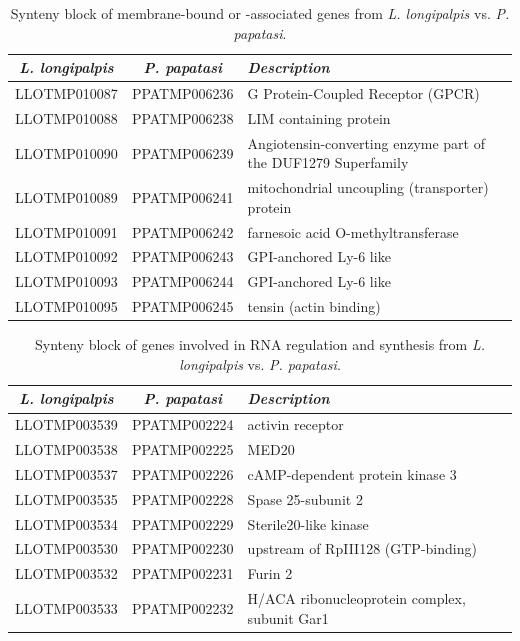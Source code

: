 \begin{table}[H]
  \centering
  \begin{tabular}{c c l} \hline
    \emph{L. longipalpis} & \emph{P. papatasi} & \emph{Description} \\ \hline
    LLOTMP010087 & PPATMP006236 & G Protein-Coupled Receptor (GPCR) \\
    LLOTMP010088 & PPATMP006238 & LIM containing protein \\
    LLOTMP010090 & PPATMP006239 & Angiotensin-converting enzyme part of the DUF1279 Superfamily \\
    LLOTMP010089 & PPATMP006241 & mitochondrial uncoupling (transporter) protein \\
    LLOTMP010091 & PPATMP006242 & farnesoic acid O-methyltransferase \\
    LLOTMP010092 & PPATMP006243 & GPI-anchored Ly-6 like \\
    LLOTMP010093 & PPATMP006244 & GPI-anchored Ly-6 like \\
    LLOTMP010095 & PPATMP006245 & tensin (actin binding)
    \end{tabular}
    \caption{Synteny block of membrane-bound or -associated genes from \emph{L. longipalpis} vs. \emph{P. papatasi}.}
  \label{tab:synteny-llot-ppat-membrane}
\end{table}

\begin{table}[H]
  \centering
  \begin{tabular}{c c l} \hline
    \emph{L. longipalpis} & \emph{P. papatasi} & \emph{Description} \\ \hline
    LLOTMP003539 & PPATMP002224 & activin receptor \\
    LLOTMP003538 & PPATMP002225 & MED20 \\
    LLOTMP003537 & PPATMP002226 & cAMP-dependent protein kinase 3 \\
    LLOTMP003535 & PPATMP002228 & Spase 25-subunit 2 \\
    LLOTMP003534 & PPATMP002229 & Sterile20-like kinase \\
    LLOTMP003530 & PPATMP002230 & upstream of RpIII128 (GTP-binding) \\
    LLOTMP003532 & PPATMP002231 & Furin 2 \\
    LLOTMP003533 & PPATMP002232 & H/ACA ribonucleoprotein complex, subunit Gar1
    \end{tabular}
    \caption{Synteny block of genes involved in RNA regulation and synthesis from \emph{L. longipalpis} vs. \emph{P. papatasi}.}
  \label{tab:synteny-llot-ppat-rna}
\end{table}

